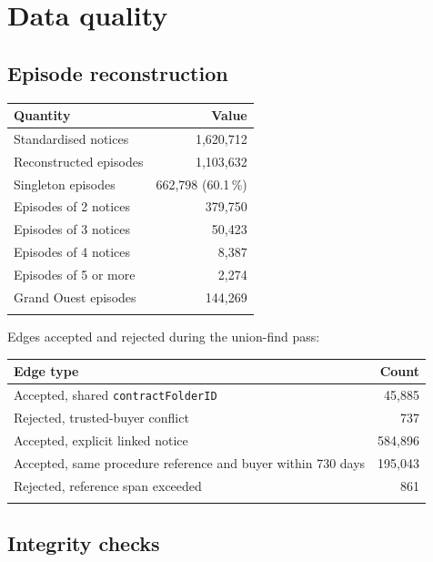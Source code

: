 \section{Data quality}
\label{app:dataquality}

\subsection*{Episode reconstruction}

\begin{longtable}[]{@{}lr@{}}
\toprule\noalign{}
Quantity & Value \\
\midrule\noalign{}
\endhead
Standardised notices & 1,620,712 \\
Reconstructed episodes & 1,103,632 \\
Singleton episodes & 662,798 (60.1\,\%) \\
Episodes of 2 notices & 379,750 \\
Episodes of 3 notices & 50,423 \\
Episodes of 4 notices & 8,387 \\
Episodes of 5 or more & 2,274 \\
Grand Ouest episodes & 144,269 \\
\bottomrule\noalign{}
\end{longtable}

Edges accepted and rejected during the union-find pass:

\begin{longtable}[]{@{}lr@{}}
\toprule\noalign{}
Edge type & Count \\
\midrule\noalign{}
\endhead
Accepted, shared \texttt{contractFolderID} & 45,885 \\
Rejected, trusted-buyer conflict & 737 \\
Accepted, explicit linked notice & 584,896 \\
Accepted, same procedure reference and buyer within 730 days & 195,043 \\
Rejected, reference span exceeded & 861 \\
\bottomrule\noalign{}
\end{longtable}

\subsection*{Integrity checks}


